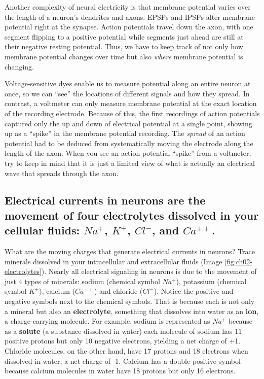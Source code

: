 \documentclass[
]{book}
\begin{document}
Another complexity of neural electricity is that membrane potential varies over the length of a neuron's dendrites and axons. EPSPs and IPSPs alter membrane potential right at the synapse. Action potentials travel down the axon, with one segment flipping to a positive potential while segments just ahead are still at their negative resting potential. Thus, we have to keep track of not only how membrane potential changes over time but also \emph{where} membrane potential is changing.

Voltage-sensitive dyes enable us to measure potential along an entire neuron at once, so we can ``see'' the locations of different signals and how they spread. In contrast, a voltmeter can only measure membrane potential at the exact location of the recording electrode. Because of this, the first recordings of action potentials captured only the up and down of electrical potential at a single point, showing up as a ``spike'' in the membrane potential recording. The \emph{spread} of an action potential had to be deduced from systematically moving the electrode along the length of the axon. When you see an action potential ``spike'' from a voltmeter, try to keep in mind that it is just a limited view of what is actually an electrical wave that spreads through the axon.

\hypertarget{electrical-currents-in-neurons-are-the-movement-of-four-electrolytes-dissolved-in-your-cellular-fluids-na-k-cl--and-ca.}{%
\subsection{\texorpdfstring{Electrical currents in neurons are the movement of four electrolytes dissolved in your cellular fluids: \(Na^+\), \(K^+\), \(Cl^{-}\), and \(Ca^{++}\).}{Electrical currents in neurons are the movement of four electrolytes dissolved in your cellular fluids: Na\^{}+, K\^{}+, Cl\^{}\{-\}, and Ca\^{}\{++\}.}}\label{electrical-currents-in-neurons-are-the-movement-of-four-electrolytes-dissolved-in-your-cellular-fluids-na-k-cl--and-ca.}}

What are the moving charges that generate electrical currents in neurons? Trace minerals dissolved in your intracellular and extracellular fluids (Image \ref{fig:ch02-electrolytes}). Nearly all electrical signaling in neurons is due to the movement of just 4 types of minerals: sodium (chemical symbol \(Na^+\)), potassium (chemical symbol \(K^+\)), calcium (\(Ca^{++}\)) and chloride (\(Cl^{-}\)). Notice the positive and negative symbols next to the chemical symbols. That is because each is not only a mineral but also an \textbf{electrolyte}, something that dissolves into water as an \textbf{ion}, a charge-carrying molecule. For example, sodium is represented as \(Na^+\) because as a \textbf{solute} (a substance dissolved in water) each molecule of sodium has 11 positive protons but only 10 negative electrons, yielding a net charge of +1. Chloride molecules, on the other hand, have 17 protons and 18 electrons when dissolved in water, a net charge of -1. Calcium has a double-positive symbol because calcium molecules in water have 18 protons but only 16 electrons.
\end{document}
